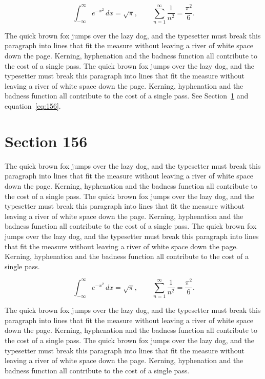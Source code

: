 \documentclass{article}
\begin{document}
\begin{equation}\label{eq:155}
\int_{-\infty}^{\infty} e^{-x^{2}}\,dx = \sqrt{\pi}, \qquad
\sum_{n=1}^{\infty} \frac{1}{n^{2}} = \frac{\pi^{2}}{6}.
\end{equation}

The quick brown fox jumps over the lazy dog, and the typesetter must break this paragraph into lines that fit the measure without leaving a river of white space down the page. Kerning, hyphenation and the badness function all contribute to the cost of a single pass. The quick brown fox jumps over the lazy dog, and the typesetter must break this paragraph into lines that fit the measure without leaving a river of white space down the page. Kerning, hyphenation and the badness function all contribute to the cost of a single pass. 
See Section~\ref{sec:156} and equation~\eqref{eq:156}.
\section{Section 156}
\label{sec:156}
The quick brown fox jumps over the lazy dog, and the typesetter must break this paragraph into lines that fit the measure without leaving a river of white space down the page. Kerning, hyphenation and the badness function all contribute to the cost of a single pass. The quick brown fox jumps over the lazy dog, and the typesetter must break this paragraph into lines that fit the measure without leaving a river of white space down the page. Kerning, hyphenation and the badness function all contribute to the cost of a single pass. The quick brown fox jumps over the lazy dog, and the typesetter must break this paragraph into lines that fit the measure without leaving a river of white space down the page. Kerning, hyphenation and the badness function all contribute to the cost of a single pass. 

\begin{equation}\label{eq:156}
\int_{-\infty}^{\infty} e^{-x^{2}}\,dx = \sqrt{\pi}, \qquad
\sum_{n=1}^{\infty} \frac{1}{n^{2}} = \frac{\pi^{2}}{6}.
\end{equation}

The quick brown fox jumps over the lazy dog, and the typesetter must break this paragraph into lines that fit the measure without leaving a river of white space down the page. Kerning, hyphenation and the badness function all contribute to the cost of a single pass. The quick brown fox jumps over the lazy dog, and the typesetter must break this paragraph into lines that fit the measure without leaving a river of white space down the page. Kerning, hyphenation and the badness function all contribute to the cost of a single pass. 
\end{document}
